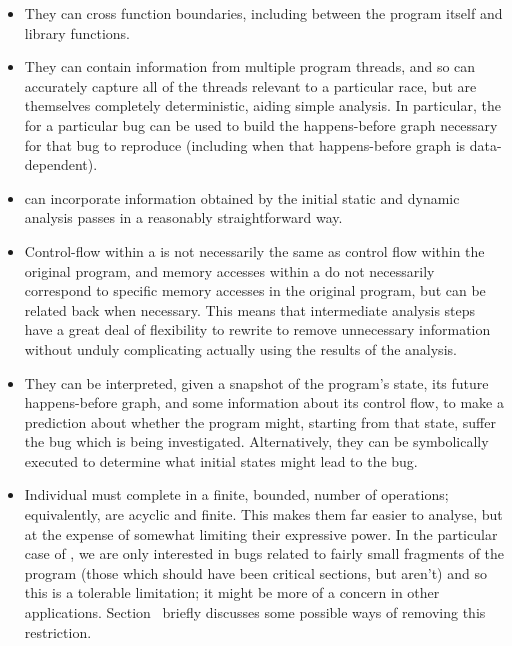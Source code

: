 \begin{itemize}
\item
  They can cross function boundaries, including between the program
  itself and library functions.
\item
  They can contain information from multiple program threads, and so
  can accurately capture all of the threads relevant to a particular
  race, but are themselves completely deterministic, aiding simple
  analysis.  In particular, the \StateMachine for a particular bug can
  be used to build the happens-before graph necessary for that bug to
  reproduce (including when that happens-before graph is
  data-dependent).
\item
  \STateMachines can incorporate information obtained by the initial
  static and dynamic analysis passes in a reasonably straightforward
  way.
\item
  Control-flow within a \StateMachine is not necessarily the same as
  control flow within the original program, and memory accesses within
  a \StateMachine do not necessarily correspond to specific memory
  accesses in the original program, but can be related back when
  necessary.  This means that intermediate analysis steps have a great
  deal of flexibility to rewrite \StateMachines to remove unnecessary
  information without unduly complicating actually using the results
  of the analysis.
\item
  They can be interpreted, given a snapshot of the program's state,
  its future happens-before graph, and some information about its
  control flow, to make a prediction about whether the program might,
  starting from that state, suffer the bug which is being
  investigated.  Alternatively, they can be symbolically executed to
  determine what initial states might lead to the bug.

\item
  Individual \StateMachines must complete in a finite, bounded, number
  of operations; equivalently, \StateMachines are acyclic and finite.
  This makes them far easier to analyse, but at the expense of
  somewhat limiting their expressive power.  In the particular case of
  \technique{}, we are only interested in bugs related to fairly small
  fragments of the program (those which should have been critical
  sections, but aren't) and so this is a tolerable limitation; it
  might be more of a concern in other applications.
  Section~ briefly discusses some possible ways of removing
  this restriction.
\end{itemize}

